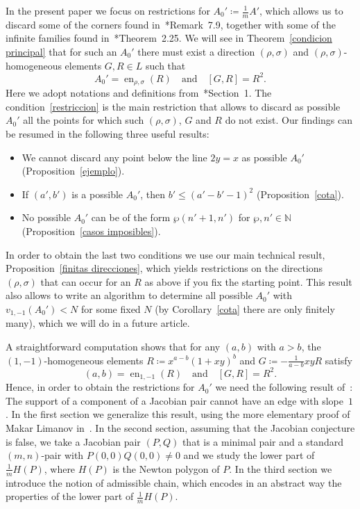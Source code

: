 \documentclass[reqno,a4paper]{amsart}
\theoremstyle{definition}
\theoremstyle{remark}
\DeclareMathOperator{\en}{en}
\begin{document}
In the present paper we focus on restrictions for $A_0'\coloneqq \frac{1}{m} A'$, which allows us to discard some of the corners found in~\cite{GGV}*{Remark~7.9}, together with some of the infinite families found in~\cite{H}*{Theorem~2.25}. We will see in Theorem~\ref{condicion principal} that for such an $A_0'$ there must exist a direction $(\rho,\sigma)$ and $(\rho,\sigma)$-homogeneous elements $G,R\in L$ such that
\begin{equation}\label{restriccion}
A_0'=\en_{\rho,\sigma}(R)\quad\text{and}\quad [G,R]= R^2.
\end{equation}
Here we adopt notations and definitions from~\cite{GGV}*{Section~1}. The condition~\eqref{restriccion} is the main restriction that allows to discard as possible $A_0'$ all the points for which such $(\rho,\sigma)$, $G$ and $R$ do not exist. Our findings can be resumed in the following three useful results:

\begin{itemize}

\smallskip

\item[-] We cannot discard any point below the line $2y=x$ as possible $A_0'$ (Proposition~\ref{ejemplo}).

\smallskip

\item[-] If $(a',b')$ is a possible $A_0'$, then $b'\le (a'-b'-1)^2$ (Proposition~\ref{cota}).

\smallskip

\item[-] No possible $A_0'$ can be of the form $\wp(n'+1,n')$ for $\wp,n'\in\mathds{N}$ (Proposition~\ref{casos imposibles}).

\smallskip
\end{itemize}
In order to obtain the last two conditions we use our main technical result, Proposition~\ref{finitas direcciones}, which yields restrictions on the directions $(\rho,\sigma)$ that can occur for an $R$ as above if you fix the starting point. This result also allows to write an algorithm to determine all possible $A_0'$ with $v_{1,-1}(A_0')<N$ for some fixed $N$  (by Corollary~\ref{cota} there are only finitely many), which we will do in a future article.

A straightforward computation shows that for any $(a,b)$ with $a>b$, the $(1,-1)$-homogeneous elements $R\coloneqq x^{a-b}(1+xy)^b$ and $G\coloneqq -\frac{1}{a-b}xy R$ satisfy
$$
(a,b)=\en_{1,-1}(R)\quad\text{and}\quad [G,R]= R^2.
$$
Hence, in order to obtain the restrictions for $A_0'$ we need the following result of~\cite{CN}: The support of a component of a Jacobian pair cannot have an edge with slope~$1$. In the first section we generalize this result, using the more elementary proof of Makar Limanov in~\cite{ML}.  In the second section, assuming that the Jacobian conjecture is false, we take a Jacobian pair $(P,Q)$ that is a minimal pair and a standard $(m,n)$-pair with $P(0,0)Q(0,0)\ne 0$ and we study the lower part of $\frac{1}{m}H(P)$, where $H(P)$ is the Newton polygon of $P$. In the third section we introduce the notion of admissible chain, which encodes in an abstract way the properties of the lower part of $\frac{1}{m}H(P)$.
\end{document}
